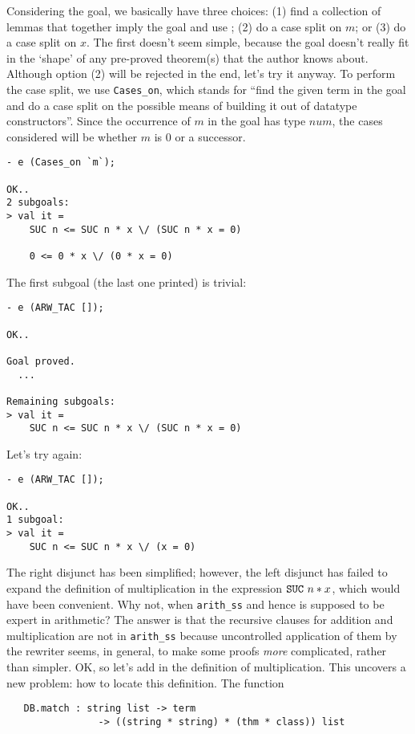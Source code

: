 Considering the goal, we basically have three choices: (1) find a
collection of lemmas that together imply the goal and use
; (2) do a case split on $m$; or (3) do a case split on
$x$. The first doesn't seem simple, because the goal doesn't really fit
in the `shape' of any pre-proved theorem(s) that the author knows
about. Although option (2) will be rejected in the end, let's try it
anyway. To perform the case split, we use \verb+Cases_on+, which stands
for ``find the given term in the goal and do a case split on the
possible means of building it out of datatype constructors''. Since the
occurrence of $m$ in the goal has type $num$, the cases considered will
be whether $m$ is $0$ or a successor.
\begin{session}\begin{verbatim}
- e (Cases_on `m`);

OK..
2 subgoals:
> val it =
    SUC n <= SUC n * x \/ (SUC n * x = 0)

    0 <= 0 * x \/ (0 * x = 0)
\end{verbatim}\end{session}
\noindent The first subgoal (the last one printed) is trivial:

\begin{session}\begin{verbatim}
- e (ARW_TAC []);

OK..

Goal proved.
  ...

Remaining subgoals:
> val it =
    SUC n <= SUC n * x \/ (SUC n * x = 0)
\end{verbatim}\end{session}
\noindent Let's try  again:
\begin{session}\begin{verbatim}
- e (ARW_TAC []);

OK..
1 subgoal:
> val it =
    SUC n <= SUC n * x \/ (x = 0)
\end{verbatim}\end{session}
The right disjunct has been simplified; however, the left disjunct has
failed to expand the definition of multiplication in the expression
$\mbox{\tt SUC}\ n * x$, which would have been convenient. Why not, when
\verb+arith_ss+ and hence  is supposed to be expert in
arithmetic? The answer is that the recursive clauses for addition and
multiplication are not in \verb+arith_ss+ because uncontrolled
application of them by the rewriter seems, in general, to make some
proofs \emph{more} complicated, rather than simpler. OK, so let's
add in the definition of multiplication. This uncovers a new problem: how
to locate this definition. The function
\begin{boxed}\begin{verbatim}
   DB.match : string list -> term
                -> ((string * string) * (thm * class)) list
\end{verbatim}\end{boxed}

